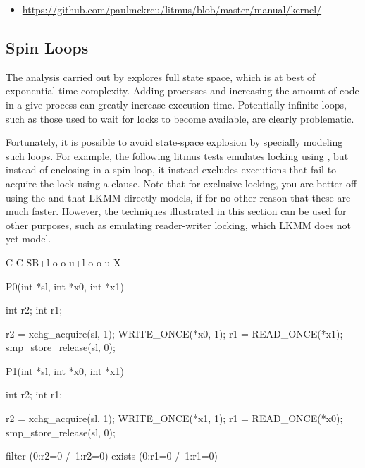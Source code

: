 \begin{itemize}
  \item	\url{https://github.com/paulmckrcu/litmus/blob/master/manual/kernel/}
\end{itemize}


\subsection{Spin Loops}

The analysis carried out by  explores full state space, which is
at best of exponential time complexity.
Adding processes and increasing the amount of code in a give process can
greatly increase execution time.
Potentially infinite loops, such as those used to wait for locks to become
available, are clearly problematic.

Fortunately, it is possible to avoid state-space explosion by specially
modeling such loops.
For example, the following litmus tests emulates locking using
, but instead of enclosing 
in a spin loop, it instead excludes executions that fail to acquire the
lock using a   clause.
Note that for exclusive locking, you are better off using the 
and  that LKMM directly models, if for no other reason
that these are much faster.
However, the techniques illustrated in this section can be used for other
purposes, such as emulating reader-writer locking, which LKMM does not yet
model.

\begin{fcvlabel}
\begin{VerbatimN}[commandchars=\%\@\$]
	C C-SB+l-o-o-u+l-o-o-u-X

	{
	}

	P0(int *sl, int *x0, int *x1)
	{
		int r2;
		int r1;

		r2 = xchg_acquire(sl, 1);   %
		WRITE_ONCE(*x0, 1);         %
		r1 = READ_ONCE(*x1);        %
		smp_store_release(sl, 0);   %
	}

	P1(int *sl, int *x0, int *x1)
	{
		int r2;
		int r1;

		r2 = xchg_acquire(sl, 1);
		WRITE_ONCE(*x1, 1);
		r1 = READ_ONCE(*x0);
		smp_store_release(sl, 0);
}

	filter (0:r2=0 /\ 1:r2=0)        %
	exists (0:r1=0 /\ 1:r1=0)
\end{VerbatimN}
\end{fcvlabel}

